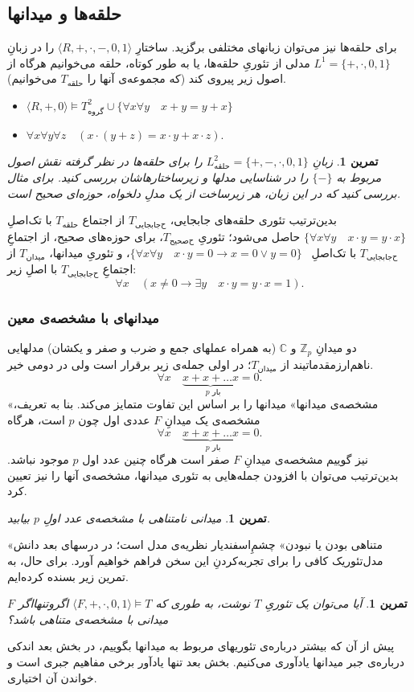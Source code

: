 \documentclass[12pt,a4paper]{article}
\theoremstyle{colorhead}
\newtheorem{tam}[thm]{تمرین}
\begin{document}
\subsection{حلقه‌ها و میدانها}
برای حلقه‌ها نیز می‌توان زبانهای مختلفی برگزید. 
ساختارِ
$\langle R,+,\cdot,-,0,1\rangle$
را
در زبانِ
\mbox{$L^1_{\text{}}=\{+,\cdot,0,1\}$}
مدلی از تئوریِ حلقه‌ها،‌ یا به طور کوتاه،
حلقه‌ 
می‌خوانیم هرگاه از اصول زیر پیروی کند (که مجموعه‌ی آنها را 
$T_{\text{حلقه}}$
می‌خوانیم).
\begin{itemize}
\item 
$\langle R,+,0\rangle \models T^2_{\text{گروه}}\cup \{\forall x\forall y \quad x+y=y+x\}$
\item 
$\forall x\forall y\forall z\quad \left(x\cdot(y+z)=x\cdot y+x\cdot z\right)$.
\end{itemize}
\begin{tam}
زبانِ
$L^2_{\text{حلقه}}=\{+,-,\cdot,0,1\}$
را برای حلقه‌ها در نظر گرفته نقش اصول مربوط به
$\{-\}$
را در شناسایی مدلها و زیرساختارهاشان بررسی کنید. برای مثال بررسی کنید که در این زبان، هر زیرساخت از یک مدلِ دلخواه، حوزه‌ای صحیح است.
\end{tam}
بدین‌ترتیب تئوری حلقه‌های جابجایی،
$T_{\text{ح‌جابجایی}}$
 از اجتماع
$T_{\text{حلقه}}$
با
تک‌اصلِ
\mbox{$\{\forall x\forall y\quad x\cdot y=y\cdot x\}$}
حاصل می‌شود؛ تئوریِ
$T_{\text{ح‌صحیح}}$،
برای حوزه‌های صحیح، از اجتماعِ
$T_{\text{ح‌جابجایی}}$
با تک‌اصلِ
\mbox{
$\{\forall x\forall y\quad x\cdot y=0\to x=0\vee y=0\}$}،
و تئوریِ میدانها،
$T_{\text{میدان}}$
از اجتماعِ
$T_{\text{ح‌جابجایی}}$
با اصلِ
زیر:
\[
\forall x \quad (x\not=0\to \exists y\quad x\cdot y=y\cdot x=1).
\]
\subsubsection{میدانهای با مشخصه‌ی معین}
دو میدانِ
$\mathbb{Z}_p$
و
$\mathbb{C}$
(به همراه عملهای جمع  و ضرب و صفر و  یکشان)  مدلهایی 
ناهم‌ارز‌مقدماتیند
از
$T_{\text{میدان}}$؛
در اولی جمله‌ی زیر برقرار است ولی در دومی خیر.
\[
\forall x\quad \underbrace{x+x+\ldots x}_{\text{ $p$ بار}}=0.
\]
«مشخصه‌ی میدانها» میدانها را بر اساس این تفاوت متمایز می‌کند.
بنا به تعریف، مشخصه‌ی یک میدانِ
$F$
عددی اول چون 
$p$
است، هرگاه
\[
\forall x\quad \underbrace{x+x+\ldots x}_{\text{ $p$ بار}}=0.
\]
نیز گوییم مشخصه‌ی میدانِ
$F$
صفر است هرگاه چنین عدد اول
$p$
موجود نباشد. بدین‌ترتیب می‌توان با افزودن جمله‌هایی به تئوری‌ میدانها، مشخصه‌ی آنها را نیز تعیین کرد.
\begin{tam}
میدانی نامتناهی با مشخصه‌ی عدد اولِ
$p$
بیابید.
\end{tam}
«متناهی بودن یا نبودن» چشم‌ِاسفندیار نظریه‌ی مدل است؛ در درسهای بعد دانش مدل‌تئوریک کافی را
برای تجربه‌کردنِ این سخن فراهم خواهیم آورد. 
برای حال، به تمرین زیر بسنده کرده‌ایم.
\begin{tam}
آیا می‌توان یک تئوریِ
$T$
نوشت، به طوری که
$\langle F,+,\cdot,0,1\rangle\models T$
اگروتنهااگر
$F$
میدانی با مشخصه‌ی متناهی باشد؟
\end{tam}
پیش از آن که بیشتر درباره‌ی تئوریهای مربوط به میدانها بگوییم، در بخش بعد اندکی درباره‌ی جبر میدانها یادآوری می‌کنیم. بخش بعد تنها یادآور برخی مفاهیم جبری است و خواندن آن اختیاری. 
\end{document}
